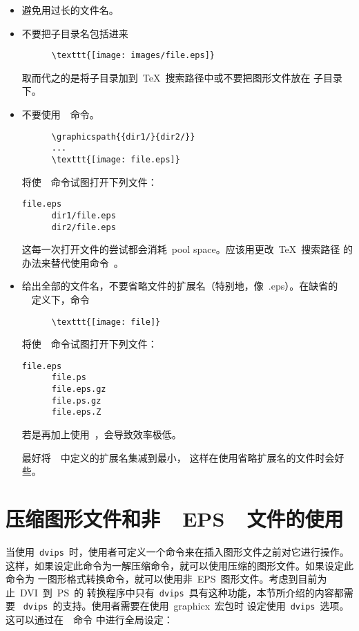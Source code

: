 \begin{itemize}
\item 避免用过长的文件名。
\item 不要把子目录名包括进来
      \begin{Verbatim}
      \texttt{[image: images/file.eps]}
      \end{Verbatim}
      取而代之的是将子目录加到~\TeX{}~搜索路径中或不要把图形文件放在
      子目录下。
\item 不要使用~~命令。
      \begin{Verbatim}
      \graphicspath{{dir1/}{dir2/}}
      ...
      \texttt{[image: file.eps]}
      \end{Verbatim}
      将使~~命令试图打开下列文件：
      \begin{Verbatim}[xleftmargin=1.5cm]
      file.eps
      dir1/file.eps
      dir2/file.eps
      \end{Verbatim}
      这每一次打开文件的尝试都会消耗~pool space。应该用更改~\TeX{}~搜索路径
      的办法来替代使用命令~。
\item 给出全部的文件名，不要省略文件的扩展名（特别地，像~.eps）。在缺省的
      ~~定义下，命令
      \begin{Verbatim}
      \texttt{[image: file]}
      \end{Verbatim}
      将使~~命令试图打开下列文件：
      \begin{Verbatim}[xleftmargin=1.5cm]
      file.eps
      file.ps
      file.eps.gz
      file.ps.gz
      file.eps.Z
      \end{Verbatim}
     若是再加上使用~，会导致效率极低。

     最好将~~中定义的扩展名集减到最小，
     这样在使用省略扩展名的文件时会好些。
\end{itemize}

\section{压缩图形文件和非~~EPS~~文件的使用}\label{sec:noneps}

当使用~\texttt{dvips}~时，使用者可定义一个命令来在插入图形文件之前对它进行操作。
这样，如果设定此命令为一解压缩命令，就可以使用压缩的图形文件。如果设定此命令为
一图形格式转换命令，就可以使用非~EPS~图形文件。考虑到目前为止~DVI~到~PS~的
转换程序中只有~\texttt{dvips}~具有这种功能，本节所介绍的内容都需要
~\texttt{dvips}~的支持。使用者需要在使用~\textsf{graphicx}~宏包时
设定使用~\texttt{dvips}~选项。这可以通过在~~命令
中进行全局设定：

